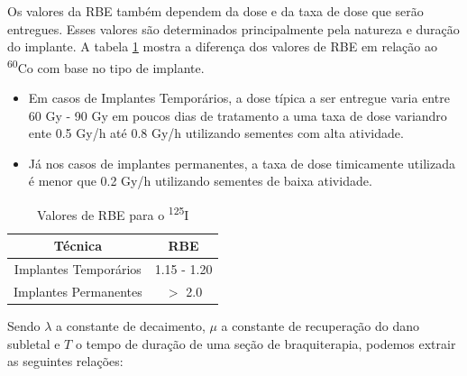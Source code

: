 \documentclass[11pt,a4paper]{article}
\begin{document}
			Os valores da RBE também dependem da dose e da taxa de dose que serão entregues. Esses valores são determinados principalmente pela natureza e duração do implante. A tabela \ref{tb:rbeI25} mostra a diferença dos valores de RBE em relação ao \textsuperscript{60}Co com base no tipo de implante.

				\begin{itemize}
					\item Em casos de \textcolor{CarnationPink}{Implantes Temporários}, a dose típica a ser entregue varia entre 60 Gy - 90 Gy em poucos dias de tratamento a uma taxa de dose variandro ente 0.5 Gy/h até 0.8 Gy/h utilizando sementes com alta atividade.
					\item Já nos casos de \textcolor{CarnationPink}{implantes permanentes}, a taxa de dose timicamente utilizada é menor que 0.2 Gy/h utilizando sementes de baixa atividade.
				\end{itemize}

				\begin{table}[h]
					\centering
					\caption{Valores de RBE para o \textsuperscript{125}I}
					\label{tb:rbeI25}
					\begin{tabular}{c c}
					\toprule
					Técnica & RBE \\
					\midrule[1.5pt]
					Implantes Temporários & 1.15 - 1.20 \\
					Implantes Permanentes & $>$ 2.0 \\
					\bottomrule
					\bottomrule
					\end{tabular}
				\end{table}

			Sendo $\lambda$ a constante de decaimento, $\mu$ a constante de recuperação do dano subletal e $T$ o tempo de duração de uma seção de braquiterapia, podemos extrair as seguintes relações:
			
\end{document}
